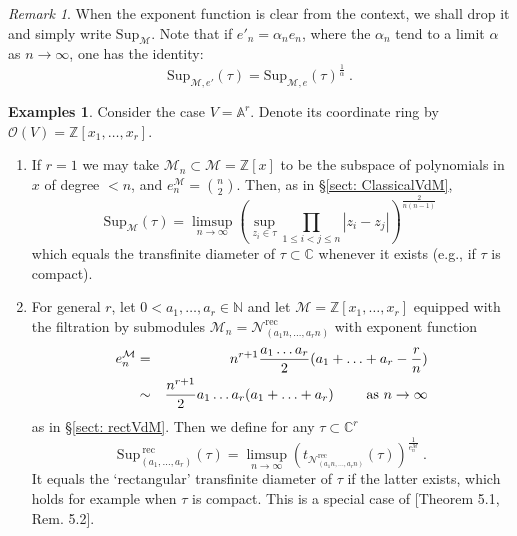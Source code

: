 \documentclass[a4paper,10pt]{amsart}
\theoremstyle{definition}
\newtheorem{ex}[thm]{Examples}
\theoremstyle{remark}
\newtheorem{rem}[thm]{Remark}
\numberwithin{equation}{section}
\newcommand{\Z}{\mathbb Z}
\newcommand{\C}{\mathbb C}
\newcommand{\rec}{\mathrm{rec}}
\newcommand{\ts}{\mathrm{Sup}}
\newcommand{\0}{\color{blue}{\mathsf{0}}}
\begin{document}
 \begin{rem} \label{rem: noe} When the exponent function is clear from the context, we shall drop it  and simply  write $\ts_{\mathcal{M}}$. Note that if $e'_n= \alpha_n e_n$, where the $\alpha_n$ tend to a limit $\alpha$ as $n\rightarrow \infty$, one has  the identity:
 \[  \ts_{\mathcal{M},e'} (\tau) = \ts_{\mathcal{M},e} (\tau)^{\frac{1}{\alpha}}\ . \]
 \end{rem}
 
 
  
  \begin{ex} \label{ex: Supstandardexamples} Consider the  case $V= \mathbb{A}^r$. Denote its coordinate ring by $\mathcal{O}(V) = \Z[x_1,\ldots, x_r]$. 
  \begin{enumerate}
  \item
  If $r=1$ we may take $\mathcal{M}_n \subset \mathcal{M}=\Z[x]$ to be the subspace of polynomials in $x$ of degree $<n$, and $e^{\mathcal{M}}_n = \binom{n}{2}$. Then, as in  \S\ref{sect: ClassicalVdM}, 
  \[  \ts_{\mathcal{M}} (\tau) =   \limsup_{n\rightarrow \infty}  \left(\sup_{z_i \in \tau}  \prod_{1\leq i<j\leq n} | z_i -z_j| \right)^{\frac{2}{n(n-1)}} \    \]
  which equals  the  transfinite diameter of  $\tau \subset \C$ whenever it exists (e.g., if $\tau$ is compact).  \\
  
  \item For general $r$, let  $0 <  a_1,\ldots, a_r \in \mathbb{N}$ and let $\mathcal{M}=\Z[x_1,\ldots, x_r]$ equipped with the filtration by submodules $\mathcal{M}_n = \mathcal{N}^{\rec}_{(a_1n, \ldots, a_rn)}$ with exponent function
  \begin{eqnarray} \label{exponent:rectangularcase}
 e^{\mathcal{M}}_{n}  &=  &  n^{r+1}  \frac{a_1 \ldots a_r}{2} (  a_1+ \ldots + a_r- \frac{r}{n})    \\
 & \sim &   \frac{n^{r+1}}{2}    a_1\ldots a_r (a_1+\ldots + a_r)   \qquad \hbox{ as } n \rightarrow \infty \nonumber
\end{eqnarray} 
 as in  \S\ref{sect: rectVdM}. 
  Then we define for any $\tau \subset \C^r$ 
  \[ \ts_{(a_1,\ldots, a_r)}^{\ \rec} (\tau) =    \limsup_{n\rightarrow \infty}   \left(t_{\mathcal{N}^{\rec}_{(a_1 n,\ldots, a_rn)}}(\tau) \right)^{\frac{1}{e^{\mathcal{M}}_n}}  \ . \]
  It equals  the `rectangular' transfinite diameter of $\tau$ if the latter  exists, which holds for example when $\tau$ is compact. This is   a special case of \cite{BBL2018}[Theorem 5.1, Rem. 5.2]. \\
   

\end{enumerate}
\end{ex}
\end{document}
